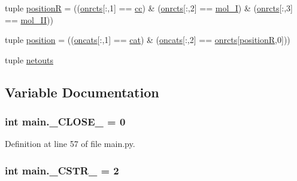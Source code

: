\begin{DoxyCompactItemize}
\item 
tuple \hyperlink{a00122_adbbdc0f6ad0f08400b3e492f7a807a6b}{position\-R} = ((\hyperlink{a00122_ab26ffc3eda5d201a779d705813b06348}{onrcts}\mbox{[}\-:,1\mbox{]} == \hyperlink{a00021_afb5980388a6e55ca55437b53cdaf528a}{cc}) \& (\hyperlink{a00122_ab26ffc3eda5d201a779d705813b06348}{onrcts}\mbox{[}\-:,2\mbox{]} == \hyperlink{a00021_ab346189eef5359a07ba32144ddcd4465}{mol\-\_\-\-I}) \& (\hyperlink{a00122_ab26ffc3eda5d201a779d705813b06348}{onrcts}\mbox{[}\-:,3\mbox{]} == \hyperlink{a00021_a4d2c086887289f8900b38ffa56854da3}{mol\-\_\-\-I\-I}))
\item 
tuple \hyperlink{a00122_ac67c60df3cc9afae7e4888d2b48b846d}{position} = ((\hyperlink{a00122_ab4d380bc4bfcb970acc39ddf18a73972}{oncats}\mbox{[}\-:,1\mbox{]} == \hyperlink{a00021_a7073f71a43389f3032e69b1fffc2551a}{cat}) \& (\hyperlink{a00122_ab4d380bc4bfcb970acc39ddf18a73972}{oncats}\mbox{[}\-:,2\mbox{]} == \hyperlink{a00122_ab26ffc3eda5d201a779d705813b06348}{onrcts}\mbox{[}\hyperlink{a00122_adbbdc0f6ad0f08400b3e492f7a807a6b}{position\-R},0\mbox{]}))
\item 
tuple \hyperlink{a00122_a02c2194d4e56d3d8c6d2c204a8017e3a}{netouts}
\end{DoxyCompactItemize}


\subsection{Variable Documentation}
\hypertarget{a00122_a05832bb8aa5b5b63ca022653c9b32af5}{
\subsubsection[{\-\_\-\-C\-L\-O\-S\-E\-\_\-}]{\setlength{\rightskip}{0pt plus 5cm}int main.\-\_\-\-C\-L\-O\-S\-E\-\_\- = 0}}\label{a00122_a05832bb8aa5b5b63ca022653c9b32af5}


Definition at line 57 of file main.\-py.

\hypertarget{a00122_a4994448f45a50087ae8864153ab89e10}{
\subsubsection[{\-\_\-\-C\-S\-T\-R\-\_\-}]{\setlength{\rightskip}{0pt plus 5cm}int main.\-\_\-\-C\-S\-T\-R\-\_\- = 2}}\label{a00122_a4994448f45a50087ae8864153ab89e10}


